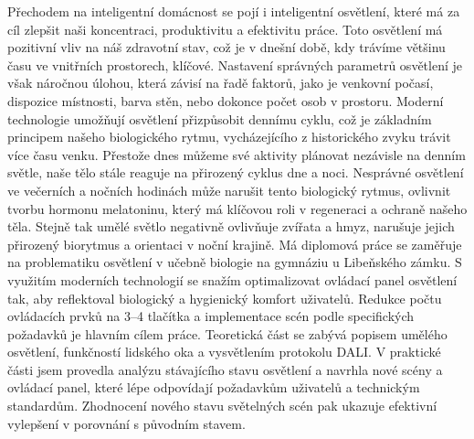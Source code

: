 




Přechodem na inteligentní domácnost se pojí i inteligentní osvětlení, které má za cíl zlepšit naši koncentraci, produktivitu a efektivitu práce. 
Toto osvětlení má pozitivní vliv na náš zdravotní stav, což je v dnešní době, kdy trávíme většinu času ve vnitřních prostorech, klíčové. 
Nastavení správných parametrů osvětlení je však náročnou úlohou, která závisí na řadě faktorů, jako je venkovní počasí,
 dispozice místnosti, barva stěn, nebo dokonce počet osob v prostoru.
\medskip
Moderní technologie umožňují osvětlení přizpůsobit dennímu cyklu, což je základním principem našeho biologického rytmu, 
vycházejícího z historického zvyku trávit více času venku. Přestože dnes můžeme své aktivity plánovat nezávisle na denním světle, 
naše tělo stále reaguje na přirozený cyklus dne a noci.
\medskip
Nesprávné osvětlení ve večerních a nočních hodinách může narušit tento biologický rytmus, ovlivnit tvorbu hormonu melatoninu,
který má klíčovou roli v regeneraci a ochraně našeho těla. Stejně tak umělé světlo negativně ovlivňuje zvířata a hmyz,
narušuje jejich přirozený biorytmus a orientaci v noční krajině.
\medskip
Má diplomová práce se zaměřuje na problematiku osvětlení v učebně biologie na gymnáziu u Libeňského zámku.
S využitím moderních technologií se snažím optimalizovat ovládací panel osvětlení tak, aby reflektoval biologický a hygienický komfort uživatelů.
Redukce počtu ovládacích prvků na 3–4 tlačítka a implementace scén podle specifických požadavků je hlavním cílem práce.
\medskip
Teoretická část se zabývá popisem umělého osvětlení, funkčností lidského oka a vysvětlením protokolu DALI. 
V praktické části jsem provedla analýzu stávajícího stavu osvětlení a navrhla nové scény a ovládací panel,
které lépe odpovídají požadavkům uživatelů a technickým standardům. Zhodnocení nového stavu světelných scén pak 
ukazuje efektivní vylepšení v porovnání s původním stavem.


